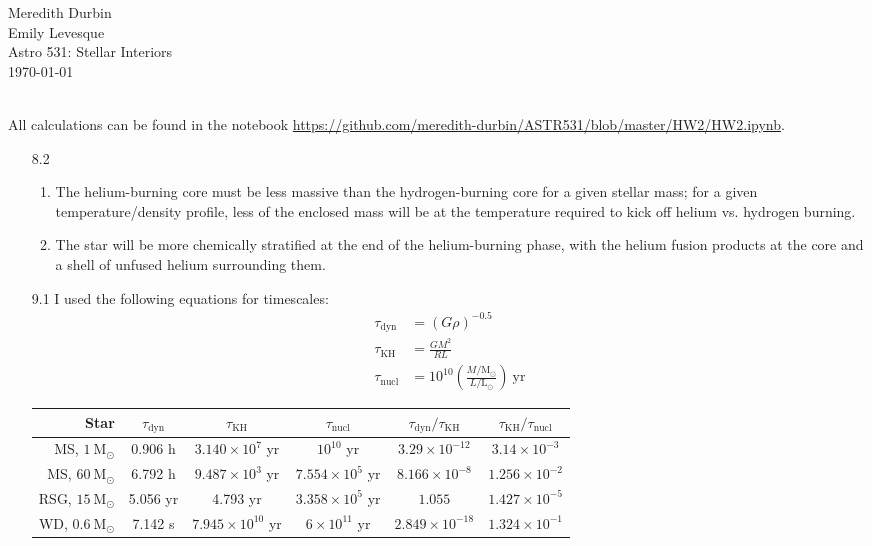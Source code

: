\documentclass[11pt]{article}
\newcommand\lsol{\mathrm{L}_\odot}
\newcommand\msol{\mathrm{M}_\odot}
\begin{document}
\begin{flushright}Meredith Durbin\\
Emily Levesque\\
Astro 531: Stellar Interiors\\
\today\\

\end{flushright}

 \\[6pt]

All calculations can be found in the notebook \url{https://github.com/meredith-durbin/ASTR531/blob/master/HW2/HW2.ipynb}.

\begin{enumerate}

\item [8.2]
	\begin{enumerate}
	
    \item The helium-burning core must be less massive than the hydrogen-burning core for a given stellar mass; for a given temperature/density profile, less of the enclosed mass will be at the temperature required to kick off helium vs. hydrogen burning.
    
    \item The star will be more chemically stratified at the end of the helium-burning phase, with the helium fusion products at the core and a shell of unfused helium surrounding them.
    
    \end{enumerate}

\item [9.1] I used the following equations for timescales:
	\begin{align}
	\tau_\mathrm{dyn} &= \left(G \rho \right)^{-0.5} \\
	\tau_\mathrm{KH} &= \frac{GM^2}{RL} \\
	\tau_\mathrm{nucl} &= 10^{10} \left( \frac{M/\msol}{L/\lsol} \right) \mathrm{\ yr}
	\end{align}
    \begin{table}[H]
    \centering
    \begin{tabular}{ r | c | c | c | c | c }
      Star & $\tau_\mathrm{dyn}$ & $\tau_\mathrm{KH}$ & $\tau_\mathrm{nucl}$ & $\tau_\mathrm{dyn}/\tau_\mathrm{KH}$ & $\tau_\mathrm{KH}/\tau_\mathrm{nucl}$ \\ \hline
      MS, $1~\msol$ & 0.906 h & $3.140\times10^7$ yr & $10^{10}$ yr & $3.29\times10^{-12}$ & $3.14\times10^{-3}$  \\
      MS, $60~\msol$ & 6.792 h & $9.487\times10^3$ yr & $7.554\times10^{5}$ yr & $8.166\times10^{-8}$ & $1.256\times10^{-2}$ \\
      RSG, $15~\msol$ & 5.056 yr & 4.793 yr & $3.358\times10^{5}$ yr & $1.055$ & $1.427\times10^{-5}$  \\
      WD, $0.6~\msol$ & 7.142 s & $7.945\times10^{10}$ yr & $6\times10^{11}$ yr & $2.849\times10^{-18}$ & $1.324\times10^{-1}$ \\
    \end{tabular}
    \end{table}
    

\end{enumerate}
\end{document}
